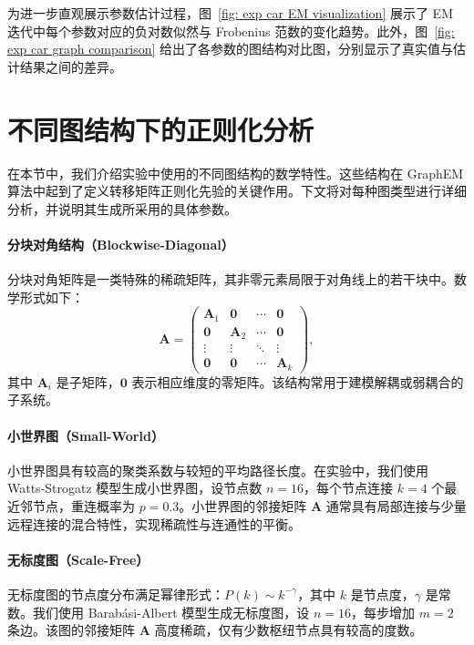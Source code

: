 为进一步直观展示参数估计过程，图~\ref{fig: exp car EM visualization} 展示了 EM 迭代中每个参数对应的负对数似然与 Frobenius 范数的变化趋势。此外，图~\ref{fig: exp car graph comparison} 给出了各参数的图结构对比图，分别显示了真实值与估计结果之间的差异。
    
\section{不同图结构下的正则化分析}

在本节中，我们介绍实验中使用的不同图结构的数学特性。这些结构在 GraphEM 算法中起到了定义转移矩阵正则化先验的关键作用。下文将对每种图类型进行详细分析，并说明其生成所采用的具体参数。

\paragraph*{分块对角结构（Blockwise-Diagonal）}
分块对角矩阵是一类特殊的稀疏矩阵，其非零元素局限于对角线上的若干块中。数学形式如下：
\[
\mathbf{A} = \begin{pmatrix}
\mathbf{A}_1 & \mathbf{0} & \cdots & \mathbf{0} \\
\mathbf{0} & \mathbf{A}_2 & \cdots & \mathbf{0} \\
\vdots & \vdots & \ddots & \vdots \\
\mathbf{0} & \mathbf{0} & \cdots & \mathbf{A}_k
\end{pmatrix},
\]
其中 \(\mathbf{A}_i\) 是子矩阵，\(\mathbf{0}\) 表示相应维度的零矩阵。该结构常用于建模解耦或弱耦合的子系统。

\paragraph*{小世界图（Small-World）}
小世界图具有较高的聚类系数与较短的平均路径长度。在实验中，我们使用 Watts-Strogatz 模型生成小世界图，设节点数 \(n = 16\)，每个节点连接 \(k = 4\) 个最近邻节点，重连概率为 \(p = 0.3\)。小世界图的邻接矩阵 \(\mathbf{A}\) 通常具有局部连接与少量远程连接的混合特性，实现稀疏性与连通性的平衡。

\paragraph*{无标度图（Scale-Free）}
无标度图的节点度分布满足幂律形式：\(P(k) \sim k^{-\gamma}\)，其中 \(k\) 是节点度，\(\gamma\) 是常数。我们使用 Barabási-Albert 模型生成无标度图，设 \(n = 16\)，每步增加 \(m = 2\) 条边。该图的邻接矩阵 \(\mathbf{A}\) 高度稀疏，仅有少数枢纽节点具有较高的度数。

